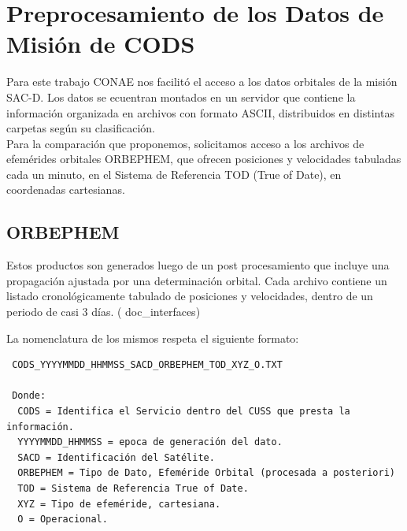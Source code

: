 \section{Preprocesamiento de los Datos de Misi\'on de CODS}
Para este trabajo CONAE nos facilit\'o el acceso a los datos orbitales de la misi\'on SAC-D.
Los datos se ecuentran montados en un servidor que contiene la informaci\'on organizada en archivos con formato ASCII, distribuidos en distintas carpetas seg\'un su clasificaci\'on.\\
Para la comparaci\'on que proponemos, solicitamos acceso a los archivos de efem\'erides orbitales ORBEPHEM, que ofrecen posiciones y velocidades tabuladas cada un minuto, en el Sistema de Referencia TOD (True of Date), en coordenadas cartesianas.

\subsection{ORBEPHEM}
Estos productos son generados luego de un post procesamiento que incluye una propagaci\'on ajustada por una determinaci\'on orbital. 
Cada archivo contiene un listado cronol\'ogicamente tabulado de posiciones y velocidades, dentro de un periodo de casi 3 d\'ias. ( doc\_interfaces)

La nomenclatura de los mismos respeta el siguiente formato:\\
\begin{verbatim}
 CODS_YYYYMMDD_HHMMSS_SACD_ORBEPHEM_TOD_XYZ_O.TXT
 
 Donde:
  CODS = Identifica el Servicio dentro del CUSS que presta la información.
  YYYYMMDD_HHMMSS = epoca de generación del dato.
  SACD = Identificación del Satélite.
  ORBEPHEM = Tipo de Dato, Efeméride Orbital (procesada a posteriori)
  TOD = Sistema de Referencia True of Date.
  XYZ = Tipo de efeméride, cartesiana.
  O = Operacional. 
\end{verbatim}


